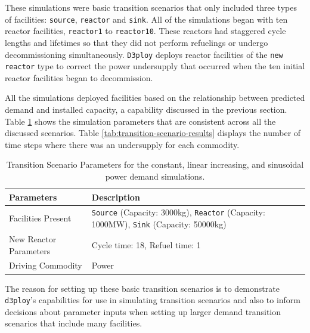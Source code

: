 \documentclass[11pt,letterpaper]{article}
\newcommand{\deploy}{\texttt{d3ploy}\xspace}%
\newcommand{\Deploy}{\texttt{D3ploy}\xspace}%
\begin{document}
These simulations were basic transition scenarios that only included 
three types of facilities: \texttt{source}, \texttt{reactor} and 
\texttt{sink}.
All of the simulations began with ten reactor facilities, 
\texttt{reactor1} to \texttt{reactor10}.
These reactors had staggered cycle lengths and lifetimes 
so that they did not perform refuelings or undergo decommissioning simultaneously.
\Deploy deploys reactor facilities of the \texttt{new reactor} type
to correct the power undersupply that occurred when the ten initial 
reactor facilities began to decommission.

All the simulations deployed facilities based on the relationship
between predicted demand and installed capacity, a capability 
discussed in the previous section.
Table \ref{tab:transition-scenario-all} shows the simulation 
parameters that are consistent across all the discussed 
scenarios. Table \ref{tab:transition-scenario-results} displays
the number of time steps where there was an undersupply for
each commodity.

\begin{table}[htb]
    \centering
    \caption {Transition Scenario Parameters for the constant, linear increasing, and sinusoidal power demand simulations.}
	\label{tab:transition-scenario-all}
    \begin{tabular}{|l|p{4.5cm}|}
    \hline
    \textbf{Parameters}    & \textbf{Description} \\ \hline
    Facilities Present     & \texttt{Source} (Capacity: 3000kg), \texttt{Reactor} (Capacity: 1000MW), \texttt{Sink} (Capacity: 50000kg)      \\ \hline
    New Reactor Parameters & Cycle time: 18, Refuel time: 1\\ \hline
    Driving Commodity & Power \\ \hline
    \end{tabular}
\end{table}

The reason for setting up these basic transition scenarios is to 
demonstrate \deploy's capabilities for use in simulating 
transition scenarios and 
also to inform decisions about parameter inputs when setting up larger 
demand transition scenarios that include many facilities. 
\end{document}
